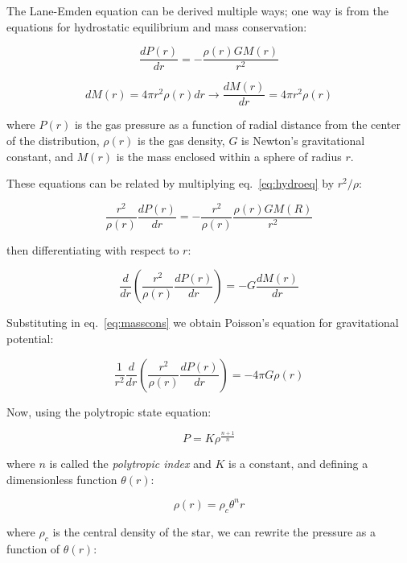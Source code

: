 \documentclass[twoside]{article}
\begin{document}
The Lane-Emden equation can be derived multiple ways; one way is from the
equations for hydrostatic equilibrium and mass conservation:

\begin{equation}
    \label{eq:hydroeq}
    \frac{dP(r)}{dr} = -\frac{\rho(r)GM(r)}{r^2}
    \end{equation}

    \begin{equation}
    \label{eq:masscons}
    dM(r)=4\pi r^2\rho(r)dr \rightarrow \frac{dM(r)}{dr} = 4\pi r^2\rho(r)
    \end{equation}

where \(P(r)\) is the gas pressure as a function of radial distance from the
center of the distribution, \(\rho(r)\) is the gas density, \(G\) is Newton's
gravitational constant, and \(M(r)\) is the mass enclosed within a sphere of
radius \(r\).

These equations can be related by multiplying eq.~\ref{eq:hydroeq} by
\(r^2/\rho\):

\[ \frac{r^2}{\rho(r)}\frac{dP(r)}{dr} = -\frac{r^2}{\rho(r)}
\frac{\rho(r)GM(R)}{r^2} \]

then differentiating with respect to \(r\):
            
\[
\frac{d}{dr}\left(\frac{r^2}{\rho(r)}\frac{dP(r)}{dr}\right)=-G\frac{dM(r)}{dr}
\]

Substituting in eq.~\ref{eq:masscons} we obtain Poisson's equation for gravitational potential:

\begin{equation}
    \label{eq:poisson}
    \frac{1}{r^2} \frac{d}{dr} \left( \frac{r^2}{\rho(r)}\frac{dP(r)}{dr} \right) = -4 \pi G\rho(r)
\end{equation}

Now, using the polytropic state equation:

\begin{equation}
    \label{eq:polytropstate}
    P=K\rho^{\frac{n+1}{n}}
\end{equation}

where \(n\) is called the \textit{polytropic index} and \(K\) is a constant, and
defining a dimensionless function \(\theta(r)\):

\begin{equation}
    \label{eq:thetar}
    \rho(r)=\rho_c\theta^n{r}
\end{equation}

where \(\rho_c\) is the central density of the star, we can rewrite the pressure
as a function of \(\theta(r)\):
\end{document}
